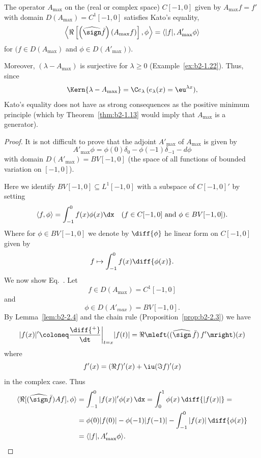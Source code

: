 \begin{example}\label{ex:b2-2.12}
The operator $A_{\max}$ on the (real or complex space) $C[-1,0]$ given by $A_{\max}f = f'$ with domain $D(A_{\max}) = C^{1}[-1,0]$ satisfies Kato's equality, \ie 
\begin{equation}\label{eq:b2-2.16}
\left\langle \Re\left[\left(\widehat{\sign} \bar{f}\right)(A_{\max}f)\right],\phi \right\rangle = \langle |f|,A'_{\max}\phi \rangle
\end{equation}
for $(f \in D(A_{\max})$ and $ \phi \in D(A'_{\max}))$.

Moreover, $(\lambda - A_{\max})$ is surjective for $\lambda \geq 0$ (\cf Example~\ref{ex:b2-1.22}).
Thus, since 
\[
	\Kern{\lambda - A_{\max}} = \C e_{\lambda} \, (e_{\lambda}(x) = \eu^{\lambda x}), 
\]
Kato's equality does not have as strong consequences as the positive minimum principle (which by Theorem~\ref{thm:b2-1.13} would imply that $A_{\max}$ is a generator).
\end{example}
\begin{proof}
It is not difficult to prove that the adjoint $A'_{\max}$ of\/ $A_{\max}$ is given by
\begin{equation}\label{eq:b2-2.17}
A'_{\max}\phi = \phi(0)\delta_{0} - \phi(-1)\delta_{-1} - d\phi
\end{equation}
with domain $D(A'_{\max}) = BV[-1,0]$ (the space of all functions of bounded variation on $[-1,0]$).

Here we identify $BV[-1,0] \subseteq L^{1}[-1,0]$ with a subspace of\/ $C[-1,0]'$ by setting 
%
\[
	\langle f,\phi \rangle = \int_{-1}^{0} f(x) \phi(x) \dx 
	\quad (f \in C[-1,0] \text{ and } \phi \in BV[-1,0]) .
\]
%
Where for $\phi \in BV[-1,0]$ we denote by $\diff{\phi}$ he linear form on $C[-1,0]$ given by 
%
\[
	f \mapsto \int_{-1}^{0} f(x)  \diff{\phi(x)} .
\]
%
We now show Eq.~.
Let 
%
\[
	f \in D(A_{\max}) = C^{1}[-1,0] 
\]
%
and 
%
\[
	\phi \in D(A'_{max}) =  BV[-1,0] .
\]
%
By Lemma~\ref{lem:b2-2.4} and the chain rule (Proposition~\ref{prop:b2-2.3}) we have
\[
|f(x)|' \coloneq \frac{\diff{^{+}}}{\dt}\bigg|_{t=x} |f(t)| 
= \Re \mleft( ( \widehat{\sign}\, \bar{f} ) \, f' \mright)(x)
\]
where
%
\[
	  f'(x) = (\Re f)'(x) + \iu (\Im f)'(x)  
\]
%
in the complex case.
Thus
\begin{align*}
\langle \Re[(\widehat{\sign} \bar{f})Af],\phi \rangle &= \int_{-1}^{0} |f(x)|'\phi(x)\, \dx = \int_{0}^{1} \phi(x)\, \diff{|f(x)|} = \\
&= \phi(0)|f(0)| - \phi(-1)|f(-1)| - \int_{-1}^{0} |f(x)|\,\diff{\phi(x)}  \\
&= \langle |f|,A'_{\max}\phi \rangle.
\tag*{\qedsymbol}%
\end{align*}
\let\qedsymbol\relax
\end{proof}
